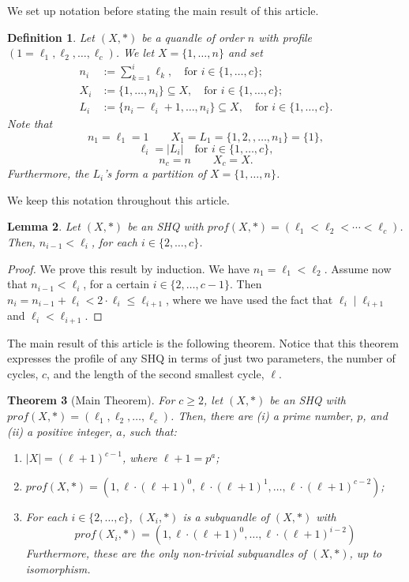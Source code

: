 \documentclass{article}
\newtheorem{theorem}{Theorem}[section]
\newtheorem{lemma}[theorem]{Lemma}
\newtheorem{definition}[theorem]{Definition}
\begin{document}
We set up notation before stating the main result of this article.

\begin{definition}\label{def:notation}
Let $(X,*)$ be a quandle of order $n$ with profile $(1=\ell_1,\ell_2,\dots,\ell_c)$. We let $X=\{1,\dots,n\}$ and set
\begin{align*}
n_i&:=\sum_{k=1}^i\ell_k,\quad\text{for
 }i\in\{1,\dots,c\};\\
X_i&:=\{1,\dots,n_i\}\subseteq X,\quad\text{for   }i\in\{1,\dots,c\};\\
L_i&:=\{n_i-\ell_i+1,\dots,n_i\}\subseteq X,\quad\text{for   }i\in\{1,\dots,c\}.
\end{align*}
Note that $$n_1=\ell_1 = 1 \qquad X_1=L_1=\{ 1, 2, , \dots , n_1 \} = \{  1  \} ,$$ $$\ell_i = |L_i|\quad\text{for   }i\in\{1,\dots,c\} ,$$ $$n_c=n \qquad X_c=X .$$ Furthermore, the $L_i$'s form a partition of $X=\{1,\dots,n\}$.
\end{definition}


We keep this notation throughout this article.

\begin{lemma}\label{lem:smaller}
Let $(X, *)$ be an SHQ with $prof(X, *)=(\ell_1 < \ell_2 < \cdots < \ell_c)$. Then,
$n_{i-1}<\ell_i$, for each $i\in\{2,\dots,c\}$.
\end{lemma}

\begin{proof}
We prove this result by induction. We have $n_1=\ell_1<\ell_2$. Assume now that $n_{i-1}<\ell_i$, for a certain $i\in\{2,\dots,c-1\}$. Then $n_i=n_{i-1}+\ell_i<2\cdot\ell_i\leq\ell_{i+1}$, where we have used the fact that $\ell_i\mid\ell_{i+1}$ and $\ell_i<\ell_{i+1}$.
\end{proof}

The main result of this article is the following theorem. Notice that this theorem expresses the profile of any SHQ in terms of just two parameters, the number of cycles, $c$, and the length of the second smallest cycle, $\ell$.

\begin{theorem}[Main Theorem]\label{thm:theone}
For $c\geq2$, let $(X,*)$ be an SHQ with $prof(X, *)=(\ell_1,\ell_2,\dots,\ell_c)$. Then, there are (i) a prime number, $p$, and (ii) a positive integer, $a$, such that:


\begin{enumerate}
    \item $|X|=(\ell+1)^{c-1}$, where $\ell+1=p^a$;
    \item $prof(X,*)=(1,\ell\cdot(\ell+1)^0,\ell\cdot(\ell+1)^1,\dots,\ell\cdot(\ell+1)^{c-2})$;
    \item For each $i\in \{ 2, \dots , c \}$, $(X_i, \ast)$ is a subquandle of $(X, \ast)$ with $$prof(X_i,*)=(1,\ell\cdot(\ell+1)^0,\dots,\ell\cdot(\ell+1)^{i-2})$$ Furthermore, these are the only non-trivial subquandles of $(X, \ast)$, up to isomorphism.
\end{enumerate}
\end{theorem}
\end{document}

